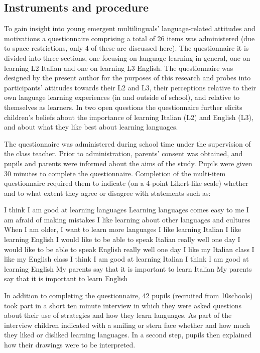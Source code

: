\documentclass[output=paper]{../langscibook}
\begin{document}
\subsection{Instruments and procedure}


To gain insight into young emergent multilinguals’ language-related attitudes and motivations a questionnaire comprising a total of 26 items was administered (due to space restrictions, only 4 of these are discussed here). The questionnaire it is divided into three sections, one focusing on language learning in general, one on learning L2 Italian and one on learning L3 English. The questionnaire was designed by the present author for the purposes of this research and probes into participants’ attitudes towards their L2 and L3, their perceptions relative to their own language learning experiences (in and outside of school), and relative to themselves as learners. In two open questions the questionnaire further elicits children’s beliefs about the importance of learning Italian (L2) and English (L3), and about what they like best about learning languages.

The questionnaire was administered during school time under the supervision of the class teacher. Prior to administration, parents’ consent was obtained, and pupils and parents were informed about the aims of the study. Pupils were given 30 minutes to complete the questionnaire. Completion of the multi-item questionnaire required them to indicate (on a 4-point Likert-like scale) whether and to what extent they agree or disagree with statements such as:

\ea
\ea I think I am good at learning languages
\ex Learning languages comes easy to me
\ex I am afraid of making mistakes
\ex I like learning about other languages and cultures
\ex When I am older, I want to learn more languages
\ex I like learning Italian
\ex I like learning English
\ex I would like to be able to speak Italian really well one day
\ex I would like to be able to speak English really well one day 
\ex I like my Italian class
\ex I like my English class
\ex I think I am good at learning Italian
\ex I think I am good at learning English 
\ex My parents say that it is important to learn Italian
\ex My parents say that it is important to learn English 
\z
\z

In addition to completing the questionnaire, 42 pupils (recruited from 10\linebreak schools) took part in a short ten minute interview in which they were asked questions about their use of strategies and how they learn languages. As part of the interview children indicated with a smiling or stern face whether and how much they liked or disliked learning languages. In a second step, pupils then explained how their drawings were to be interpreted. 
\end{document}
